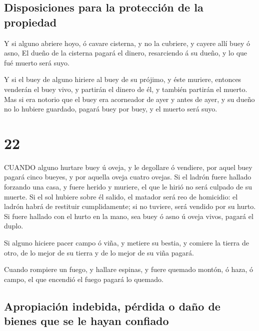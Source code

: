 \hypertarget{disposiciones-para-la-protecciuxf3n-de-la-propiedad}{%
\subsection{Disposiciones para la protección de la
propiedad}\label{disposiciones-para-la-protecciuxf3n-de-la-propiedad}}

 Y si alguno abriere hoyo, ó cavare cisterna, y no la
cubriere, y cayere allí buey ó asno,  El dueño de la
cisterna pagará el dinero, resarciendo á su dueño, y lo que fué muerto
será suyo.

 Y si el buey de alguno hiriere al buey de su prójimo, y
éste muriere, entonces venderán el buey vivo, y partirán el dinero de
él, y también partirán el muerto.  Mas si era notorio que
el buey era acorneador de ayer y antes de ayer, y su dueño no lo hubiere
guardado, pagará buey por buey, y el muerto será suyo.

\hypertarget{section-21}{%
\section{22}\label{section-21}}

 CUANDO alguno hurtare buey ú oveja, y le degollare ó
vendiere, por aquel buey pagará cinco bueyes, y por aquella oveja cuatro
ovejas.  Si el ladrón fuere hallado forzando una casa, y
fuere herido y muriere, el que le hirió no será culpado de su muerte.
 Si el sol hubiere sobre él salido, el matador será reo de
homicidio: el ladrón habrá de restituir cumplidamente; si no tuviere,
será vendido por su hurto.  Si fuere hallado con el hurto en
la mano, sea buey ó asno ú oveja vivos, pagará el duplo.

 Si alguno hiciere pacer campo ó viña, y metiere su bestia,
y comiere la tierra de otro, de lo mejor de su tierra y de lo mejor de
su viña pagará.

 Cuando rompiere un fuego, y hallare espinas, y fuere
quemado montón, ó haza, ó campo, el que encendió el fuego pagará lo
quemado.

\hypertarget{apropiaciuxf3n-indebida-puxe9rdida-o-dauxf1o-de-bienes-que-se-le-hayan-confiado}{%
\subsection{Apropiación indebida, pérdida o daño de bienes que se le
hayan
confiado}\label{apropiaciuxf3n-indebida-puxe9rdida-o-dauxf1o-de-bienes-que-se-le-hayan-confiado}}


